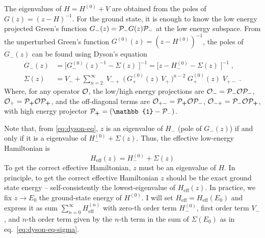 The eigenvalues of $H=H^{(0)}+V$ are obtained from the poles of $G(z)=(z-H)^{-1}$. For the ground state, it is enough to know the low energy projected Green's function $G_{-}(z) = \mathcal{P}_{ {-} } G(z) \mathcal{P}_{ {-} }$ at the low energy subspace. From the unperturbed Green's function $G^{(0)}(z)=(z-H^{(0)})^{-1}$, the poles of $G_{-}(z)$ can be found using Dyson's equation \cite{Bravyi_2011}
\begin{align}
    G_{{-}}(z) &= \Big[ G^{(0)}_{{-}}(z)^{-1} - \Sigma(z) \;  \Big]^{-1}
    = \Big[ z-H^{(0)}_{{-}} - \Sigma(z) \;  \Big]^{-1} \label{eq:dyson-eq}
    \; , \\
    \Sigma(z) &= V_{{-}}  + \sum_{n=2}^{\infty} \;
    V_{{-+}} \; \Big(\,  G_{\bm{+}}^{(0)}(z)\,V_{\bm{+}}   \,\Big)^{n-2} \; G^{(0)}_{\bm{+}}(z)  \; V_{{+-}}  \; .
    \label{eq:dyson-eq-sigma}
\end{align}
Where, for any operator $\mathcal{O}$, the low/high energy projections are $\mathcal{O}_{-}=\mathcal{P}_{ {-} } \mathcal{O} \mathcal{P}_{ {-} }$, $\mathcal{O}_{+}=\mathcal{P}_{ \bm{+} }  \mathcal{O} \mathcal{P}_{ \bm{+} } $, and the off-diagonal terms are  $\mathcal{O}_{+-}=\mathcal{P}_{ \bm{+} }  \mathcal{O} \mathcal{P}_{ {-} }$, $\mathcal{O}_{-+}=\mathcal{P}_{ {-} } \mathcal{O} \mathcal{P}_{ \bm{+} } $, with high energy projector $ \cP_{ \bm{+} }=(\mathbb{1}-\cP_{ {-} })$.

Note that, from \eqref{eq:dyson-eq}, $z$ is an eigenvalue of $H_{-}$ (pole of $G_{{-}}(z)$) if and only if it is a eigenvalue of $H^{(0)}_{{-}}+\Sigma(z)$.
Thus, the effective low-energy Hamiltonian is
\begin{equation}
    H_{\text{eff}}(z) = H^{(0)}_{{-}}+\Sigma(z)
\end{equation}
To get the correct effective Hamiltonian, $z$ must be an eigenvalue of $H$.
In principle, to get the correct effective Hamiltonian $z$ should be the exact ground state energy -- self-consistently the lowest-eigenvalue of $H_{\text{eff}}(z) $.
In practice, we fix $z \to E_0$ the ground-state energy of $H^{(0)}$. I will set $H_{\text{eff}} = H_{\text{eff}}(E_0)$ and express it as sum $\sum_{n=0}^{\infty} H_{\text{eff}}^{(n)}$ with zero-th order term $H^{(0)}_{{-}}$, first order term $V_{{-}}$, and $n$-th order term given by the $n$-th term in the sum of $\Sigma(E_0)$ as in eq.~\eqref{eq:dyson-eq-sigma}.





